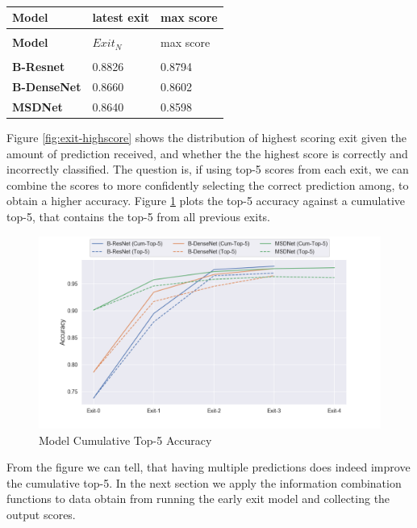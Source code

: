 \begin{longtabu}{>{\bfseries}X|X|X}
	\caption[]{} \label{tbl:latest-vs-max} \\
	\toprule
	\rowfont{\bfseries}
	Model & latest exit & max score   \tabularnewline
	\bottomrule
	\endfirsthead
	\\
	\toprule
	\rowfont{\bfseries}
	Model & $Exit_N$ & max score    \tabularnewline
	\bottomrule
	\endhead %
	\bottomrule
	\\
	\endfoot
	\hline
	\endlastfoot
	B-Resnet	& 0.8826	& 0.8794  \tabularnewline
	\hline
	B-DenseNet	& 0.8660 	& 0.8602 \tabularnewline
	\hline
	MSDNet		& 0.8640 	& 0.8598 \tabularnewline							
	\bottomrule
\end{longtabu}

Figure \ref{fig:exit-highscore} shows the distribution of highest scoring exit given the amount of prediction received, and whether the the highest score is correctly and incorrectly classified. The question is, if using top-5 scores from each exit, we can combine the scores to more confidently selecting the correct prediction among, to obtain a higher accuracy. Figure \ref{fig:top-5-cumulative} plots the top-5 accuracy against a cumulative top-5, that contains the top-5 from all previous exits. 

\begin{figure}
	\centering
	\includegraphics[width=.8\linewidth]{figures/edge/top5cumulative}
	\caption[Top-5 Cumulative]{Model Cumulative Top-5 Accuracy}
	\label{fig:top-5-cumulative}
\end{figure}

From the figure we can tell, that having multiple predictions does indeed improve the cumulative top-5. In the next section we apply the information combination functions to data obtain from running the early exit model and collecting the output scores. 

